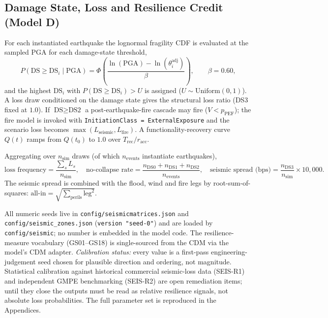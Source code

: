 \documentclass[11pt,a4paper]{article}
\begin{document}
\subsection{Damage State, Loss and Resilience Credit (Model D)}
For each instantiated earthquake the lognormal fragility CDF is evaluated at the
sampled PGA for each damage-state threshold,
\[
  P(\text{DS} \ge \text{DS}_i \mid \text{PGA}) =
  \Phi\!\left(\frac{\ln(\text{PGA}) - \ln(\theta^{\text{adj}}_{i})}{\beta}\right),
  \qquad \beta = 0.60,
\]
and the highest $\text{DS}_i$ with $P(\text{DS} \ge \text{DS}_i) > U$ is assigned
($U \sim \text{Uniform}(0,1)$). A loss draw conditioned on the damage state gives
the structural loss ratio (DS3 fixed at $1.0$). If $\text{DS} \ge \text{DS2}$ a
post-earthquake-fire cascade may fire ($V < p_{\text{PEF}}$); the fire model is
invoked with \texttt{InitiationClass = ExternalExposure} and the scenario loss
becomes $\max(L_{\text{seismic}}, L_{\text{fire}})$. A functionality-recovery
curve $Q(t)$ ramps from $Q(t_0)$ to $1.0$ over $T_{\text{rec}}/r_{\text{acc}}$.

Aggregating over $n_{\text{sim}}$ draws (of which $n_{\text{events}}$ instantiate
earthquakes),
\[
  \text{loss frequency} = \frac{\sum_s L_s}{n_{\text{sim}}}, \quad
  \text{no-collapse rate} = \frac{n_{\text{DS0}}+n_{\text{DS1}}+n_{\text{DS2}}}
                                  {n_{\text{events}}}, \quad
  \text{seismic spread (bps)} = \frac{n_{\text{DS3}}}{n_{\text{sim}}}\times 10{,}000.
\]
The seismic spread is combined with the flood, wind and fire legs by
root-sum-of-squares: $\text{all-in} = \sqrt{\sum_{\text{perils}} \text{leg}^2}$.

\mkminputs

All numeric seeds live in \texttt{config/seismicmatrices.json} and
\texttt{config/seismic\_zones.json} (\texttt{version "seed-0"}) and are loaded by
\texttt{config/seismic}; no number is embedded in the model code. The
resilience-measure vocabulary (GS01--GS18) is single-sourced from the CDM via the
model's CDM adapter. \emph{Calibration status:} every value is a first-pass
engineering-judgement seed chosen for plausible direction and ordering, not
magnitude. Statistical calibration against historical commercial seismic-loss
data (SEIS-R1) and independent GMPE benchmarking (SEIS-R2) are open remediation
items; until they close the outputs must be read as relative resilience signals,
not absolute loss probabilities. The full parameter set is reproduced in the
Appendices.
\end{document}
